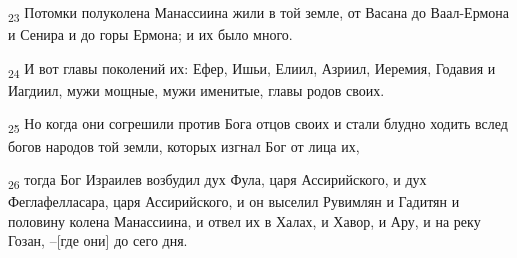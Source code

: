 \begin{tcolorbox}
\textsubscript{23} Потомки полуколена Манассиина жили в той земле, от Васана до Ваал-Ермона и Сенира и до горы Ермона; и их было много.
\end{tcolorbox}
\begin{tcolorbox}
\textsubscript{24} И вот главы поколений их: Ефер, Ишьи, Елиил, Азриил, Иеремия, Годавия и Иагдиил, мужи мощные, мужи именитые, главы родов своих.
\end{tcolorbox}
\begin{tcolorbox}
\textsubscript{25} Но когда они согрешили против Бога отцов своих и стали блудно ходить вслед богов народов той земли, которых изгнал Бог от лица их,
\end{tcolorbox}
\begin{tcolorbox}
\textsubscript{26} тогда Бог Израилев возбудил дух Фула, царя Ассирийского, и дух Феглафелласара, царя Ассирийского, и он выселил Рувимлян и Гадитян и половину колена Манассиина, и отвел их в Халах, и Хавор, и Ару, и на реку Гозан, --[где они] до сего дня.
\end{tcolorbox}
